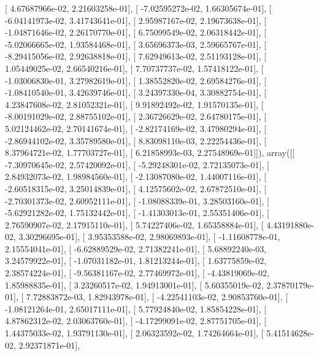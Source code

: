 \documentclass{article}
\begin{document}
       [  4.67687966e-02,   2.21603258e-01],
       [ -7.02595272e-02,   1.66305674e-01],
       [ -6.04141973e-02,   3.41743641e-01],
       [  2.95987167e-02,   2.19673638e-01],
       [ -1.04871646e-02,   2.26170770e-01],
       [  6.75099549e-02,   2.06318442e-01],
       [ -5.02066665e-02,   1.93584468e-01],
       [  3.65696373e-03,   2.59665767e-01],
       [ -8.29415056e-02,   2.92638818e-01],
       [  7.62949613e-02,   2.51193128e-01],
       [  1.05449025e-02,   2.66540216e-01],
       [  7.70737737e-02,   1.57418122e-01],
       [ -1.03006830e-01,   3.27982619e-01],
       [  1.38552820e-02,   2.69584276e-01],
       [ -1.08410540e-01,   3.42639746e-01],
       [  3.24397330e-04,   3.30882754e-01],
       [  4.23847608e-02,   2.81052321e-01],
       [  9.91892492e-02,   1.91570135e-01],
       [ -8.00191029e-02,   2.88755102e-01],
       [  2.36726629e-02,   2.64780175e-01],
       [  5.02124462e-02,   2.70141674e-01],
       [ -2.82174169e-02,   3.47980294e-01],
       [ -2.86944102e-02,   3.35789580e-01],
       [  8.83098110e-03,   2.22254436e-01],
       [  8.37964721e-02,   1.77703727e-01],
       [  6.21858993e-03,   2.27548969e-01]]), array([[ -7.30970645e-02,   2.57420092e-01],
       [ -5.29248301e-02,   2.72135073e-01],
       [  2.84932073e-02,   1.98984560e-01],
       [ -2.13087080e-02,   1.44007116e-01],
       [ -2.60518315e-02,   3.25014839e-01],
       [  4.12575602e-02,   2.67872510e-01],
       [ -2.70301373e-02,   2.60952111e-01],
       [ -1.08088339e-01,   3.28503160e-01],
       [ -5.62921282e-02,   1.75132442e-01],
       [ -1.41303013e-01,   2.55351406e-01],
       [  2.76590907e-02,   2.17915110e-01],
       [  5.74227406e-02,   1.65358884e-01],
       [  4.43191880e-02,   3.30296695e-01],
       [  3.95353588e-02,   2.98069893e-01],
       [ -1.11608778e-01,   2.15554041e-01],
       [ -6.62889529e-02,   2.71382241e-01],
       [  5.68892240e-03,   3.24579922e-01],
       [ -1.07031182e-01,   1.81213244e-01],
       [  1.63775859e-02,   2.38574224e-01],
       [ -9.56381167e-02,   2.77469972e-01],
       [ -4.43819069e-02,   1.85988835e-01],
       [  3.23260517e-02,   1.94913001e-01],
       [  5.60355019e-02,   2.37870179e-01],
       [  7.72883872e-03,   1.82943978e-01],
       [ -4.22541103e-02,   2.90853760e-01],
       [ -1.08121264e-01,   2.65017111e-01],
       [  5.77924840e-02,   1.85854228e-01],
       [  4.87862312e-02,   2.03063760e-01],
       [ -4.17299091e-02,   2.87751705e-01],
       [  1.44375033e-02,   1.93791130e-01],
       [  2.06323592e-02,   1.74264664e-01],
       [  5.41514628e-02,   2.92371871e-01],
\end{document}
